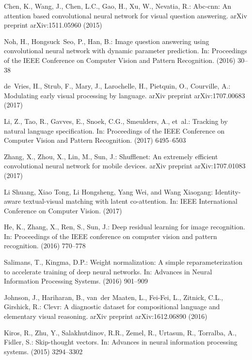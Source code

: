 \documentclass[runningheads]{llncs}
\begin{document}
\begin{thebibliography}{8}
Chen, K., Wang, J., Chen, L.C., Gao, H., Xu, W., Nevatia, R.:
\newblock Abc-cnn: An attention based convolutional neural network for visual
  question answering.
\newblock arXiv preprint arXiv:1511.05960 (2015)

Noh, H., Hongsuck~Seo, P., Han, B.:
\newblock Image question answering using convolutional neural network with
  dynamic parameter prediction.
\newblock In: Proceedings of the IEEE Conference on Computer Vision and Pattern
  Recognition. (2016)  30--38

de~Vries, H., Strub, F., Mary, J., Larochelle, H., Pietquin, O., Courville, A.:
\newblock Modulating early visual processing by language.
\newblock arXiv preprint arXiv:1707.00683 (2017)

Li, Z., Tao, R., Gavves, E., Snoek, C.G., Smeulders, A.,  et~al.:
\newblock Tracking by natural language specification.
\newblock In: Proceedings of the IEEE Conference on Computer Vision and Pattern
  Recognition. (2017)  6495--6503

Zhang, X., Zhou, X., Lin, M., Sun, J.:
\newblock Shufflenet: An extremely efficient convolutional neural network for
  mobile devices.
\newblock arXiv preprint arXiv:1707.01083 (2017)

Li Shuang, Xiao Tong, Li Hongsheng, Yang Wei, and Wang Xiaogang:
\newblock Identity-aware textual-visual matching with latent co-attention.
\newblock In: IEEE International Conference on Computer Vision. (2017)

He, K., Zhang, X., Ren, S., Sun, J.:
\newblock Deep residual learning for image recognition.
\newblock In: Proceedings of the IEEE conference on computer vision and pattern
  recognition. (2016)  770--778

Salimans, T., Kingma, D.P.:
\newblock Weight normalization: A simple reparameterization to accelerate
  training of deep neural networks.
\newblock In: Advances in Neural Information Processing Systems. (2016)
  901--909

Johnson, J., Hariharan, B., van~der Maaten, L., Fei-Fei, L., Zitnick, C.L.,
  Girshick, R.:
\newblock Clevr: A diagnostic dataset for compositional language and elementary
  visual reasoning.
\newblock arXiv preprint arXiv:1612.06890 (2016)

Kiros, R., Zhu, Y., Salakhutdinov, R.R., Zemel, R., Urtasun, R., Torralba, A.,
  Fidler, S.:
\newblock Skip-thought vectors.
\newblock In: Advances in neural information processing systems. (2015)
  3294--3302


\end{thebibliography}
\end{document}
